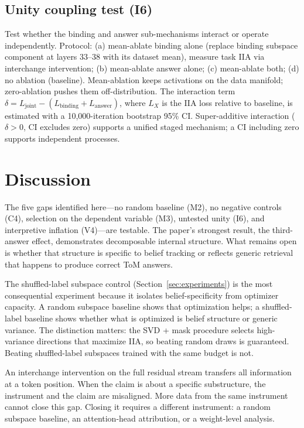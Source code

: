\documentclass[11pt]{article}
\begin{document}
\subsection{Unity coupling test (I6)}

Test whether the binding and answer sub-mechanisms interact or operate independently. Protocol: (a) mean-ablate binding alone (replace binding subspace component at layers 33--38 with its dataset mean), measure task IIA via interchange intervention; (b) mean-ablate answer alone; (c) mean-ablate both; (d) no ablation (baseline). Mean-ablation keeps activations on the data manifold; zero-ablation pushes them off-distribution. The interaction term $\delta = L_{\text{joint}} - (L_{\text{binding}} + L_{\text{answer}})$, where $L_X$ is the IIA loss relative to baseline, is estimated with a 10{,}000-iteration bootstrap 95\% CI. Super-additive interaction ($\delta > 0$, CI excludes zero) supports a unified staged mechanism; a CI including zero supports independent processes.


\section{Discussion}
\label{sec:discussion}

The five gaps identified here---no random baseline (M2), no negative controls (C4), selection on the dependent variable (M3), untested unity (I6), and interpretive inflation (V4)---are testable. The paper's strongest result, the third-answer effect, demonstrates decomposable internal structure. What remains open is whether that structure is specific to belief tracking or reflects generic retrieval that happens to produce correct ToM answers.

The shuffled-label subspace control (Section~\ref{sec:experiments}) is the most consequential experiment because it isolates belief-specificity from optimizer capacity. A random subspace baseline shows that optimization helps; a shuffled-label baseline shows whether what is optimized is belief structure or generic variance. The distinction matters: the SVD + mask procedure selects high-variance directions that maximize IIA, so beating random draws is guaranteed. Beating shuffled-label subspaces trained with the same budget is not.

An interchange intervention on the full residual stream transfers all information at a token position. When the claim is about a specific substructure, the instrument and the claim are misaligned. More data from the same instrument cannot close this gap. Closing it requires a different instrument: a random subspace baseline, an attention-head attribution, or a weight-level analysis.
\end{document}
